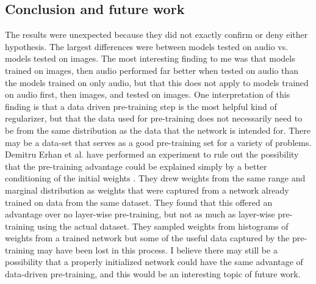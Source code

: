 \documentclass[12pt]{article}
\begin{document}
\begin{doublespacing}
	\subsection{Conclusion and future work}
The results were unexpected because they did not exactly confirm or deny either hypothesis. The largest differences were between models tested on audio vs. models tested on images. The most interesting finding to me was that models trained on images, then audio performed far better when tested on audio than the models trained on only audio, but that this does not apply to models trained on audio first, then images, and tested on images. One interpretation of this finding is that a data driven pre-training step is the most helpful kind of regularizer, but that the data used for pre-training does not necessarily need to be from the same distribution as the data that the network is intended for. There may be a data-set that serves as a good pre-training set for a variety of problems. Demitru Erhan et al. have performed an experiment to rule out the possibility that the pre-training advantage could be explained simply by a better conditioning of the initial weights \cite{erhan2009difficulty}. They drew weights from the same range and marginal distribution as weights that were captured from a network already trained on data from the same dataset. They found that this offered an advantage over no layer-wise pre-training, but not as much as layer-wise pre-training using the actual dataset. They sampled weights from histograms of weights from a trained network but some of the useful data captured by the pre-training may have been lost in this process. I believe there may still be a possibility that a properly initialized network could have the same advantage of data-driven pre-training, and this would be an interesting topic of future work.


\end{doublespacing}
\end{document}
